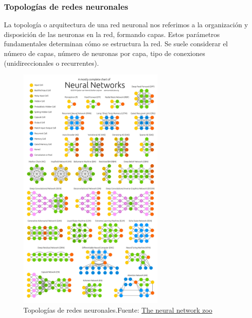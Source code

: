 
\subsubsection{Topologías de redes neuronales}
La topología o arquitectura de una red neuronal nos referimos a la organización y disposición de las neuronas en la red, formando capas. Estos parámetros fundamentales determinan cómo se estructura la red.
Se suele considerar el número de capas, número de neuronas por capa, tipo de conexiones (unidireccionales o recurrentes).


\begin{figure}[H]
    \centering
    \includegraphics[width=0.65\textwidth]{figures/NeuralNetworkZo19High.png}
    \caption{Topologías de redes neuronales.\newline{}Fuente: \href{https://www.asimovinstitute.org/neural-network-zoo/}{The neural network zoo}}
    \label{fig:NeuralNetworkZo19High}
\end{figure}


